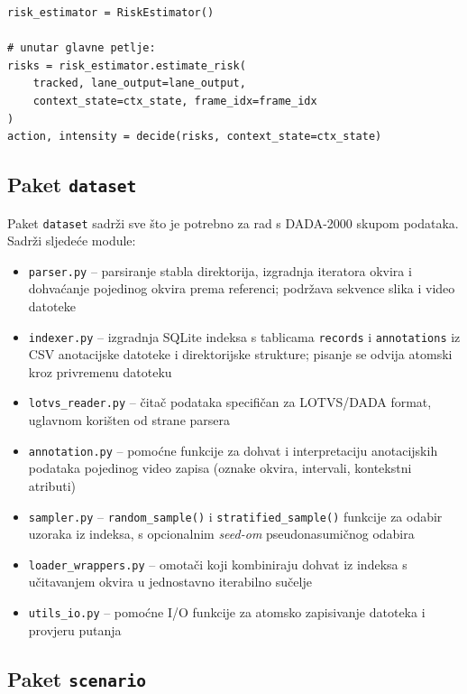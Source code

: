 \begin{lstlisting}[style=pycode, caption={Procjena rizika i donošenje odluke}, label={lst:risk}]
risk_estimator = RiskEstimator()

# unutar glavne petlje:
risks = risk_estimator.estimate_risk(
    tracked, lane_output=lane_output,
    context_state=ctx_state, frame_idx=frame_idx
)
action, intensity = decide(risks, context_state=ctx_state)
\end{lstlisting}

\subsection{Paket \texttt{dataset}}

Paket \texttt{dataset} sadrži sve što je potrebno za rad s DADA-2000 skupom podataka. Sadrži sljedeće module:

\begin{itemize}
    \item \texttt{parser.py} -- parsiranje stabla direktorija, izgradnja iteratora okvira i dohvaćanje pojedinog okvira prema referenci; podržava sekvence slika i video datoteke
    \item \texttt{indexer.py} -- izgradnja SQLite indeksa s tablicama \texttt{records} i \texttt{annotations} iz CSV anotacijske datoteke i direktorijske strukture; pisanje se odvija atomski kroz privremenu datoteku
    \item \texttt{lotvs\_reader.py} -- čitač podataka specifičan za LOTVS/DADA format, uglavnom korišten od strane parsera
    \item \texttt{annotation.py} -- pomoćne funkcije za dohvat i interpretaciju anotacijskih podataka pojedinog video zapisa (oznake okvira, intervali, kontekstni atributi)
    \item \texttt{sampler.py} -- \texttt{random\_sample()} i \texttt{stratified\_sample()} funkcije za odabir uzoraka iz indeksa, s opcionalnim \textit{seed-om} pseudonasumičnog odabira
    \item \texttt{loader\_wrappers.py} -- omotači koji kombiniraju dohvat iz indeksa s učitavanjem okvira u jednostavno iterabilno sučelje
    \item \texttt{utils\_io.py} -- pomoćne I/O funkcije za atomsko zapisivanje datoteka i provjeru putanja
\end{itemize}

\subsection{Paket \texttt{scenario}}

